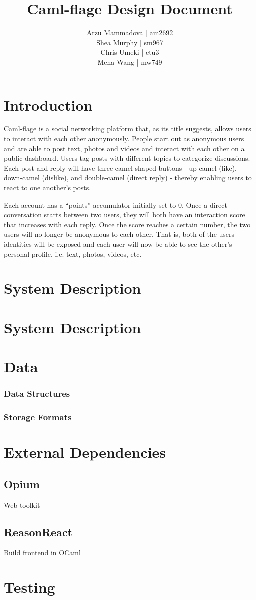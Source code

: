 \documentclass[11pt]{article}
\title{Caml-flage Design Document}
\author{Arzu Mammadova | am2692 \\ Shea Murphy | sm967 \\ Chris Umeki | ctu3 \\ Mena Wang | mw749}
\begin{document}
\maketitle

\section{Introduction}
Caml-flage is a social networking platform that, as its title suggests, allows users to interact with each other anonymously. People start out as anonymous users and are able to post text, photos and videos and interact with each other on a public dashboard. Users tag posts with different topics to categorize discussions. Each post and reply will have three camel-shaped buttons - up-camel (like), down-camel (dislike), and double-camel (direct reply) - thereby enabling users to react to one another’s posts. 

Each account has a “points” accumulator initially set to 0. Once a direct conversation starts between two users, they will both have an interaction score that increases with each reply. Once the score reaches a certain number, the two users will no longer be anonymous to each other. That is, both of the users identities will be exposed and each user will now be able to see the other’s personal profile, i.e. text, photos, videos, etc. 


\section{System Description}


\section{System Description}

\section{Data}

\subsubsection{Data Structures}

\subsubsection{Storage Formats}

\section{External Dependencies}

\subsection{Opium}
Web toolkit 

\subsection{ReasonReact}
Build frontend in OCaml

\section{Testing}
\end{document}
